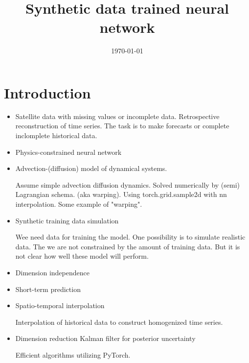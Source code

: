 \documentclass[a4paper,12pt]{article}
\title{Synthetic data trained neural network}
\author{}
\date{\today}
\begin{document}
\maketitle

\begin{abstract}
\end{abstract}

\section{Introduction}

\begin{itemize}
\item     
    Satellite data with missing values or incomplete data. Retrospective reconstruction of time series. The task is to make forecasts or complete inclomplete historical data.

    \item
        Physics-constrained neural network
    \item
        Advection-(diffusion) model of dynamical systems.

        Assume simple advection diffusion dynamics. Solved numerically by (semi) Lagrangian schema. (aka warping). Using torch.grid.sample2d with nn interpolation. Some example of "warping".

    \item
        Synthetic training data simulation

        Wee need data for training the model. One possibility is to simulate realistic data. The we are not constrained by the amount of training data. But it is not clear  how well these model will perform.

    \item
        Dimension independence
    \item
        Short-term prediction
    \item
        Spatio-temporal interpolation

        Interpolation of historical data to construct homogenized time series.

    \item
        Dimension reduction Kalman filter for posterior uncertainty

        Efficient algorithms utilizing PyTorch.

\end{itemize}
\end{document}
